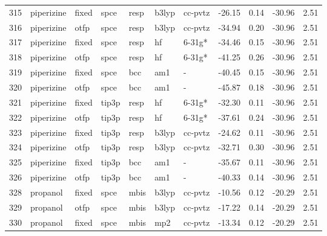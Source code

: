 \begin{tabular}{lllllllrrrr}
315 &                    piperizine &  fixed &   spce &   resp &   b3lyp &      cc-pvtz &      -26.15 &     0.14 &      -30.96 &      2.51 \\
316 &                    piperizine &   otfp &   spce &   resp &   b3lyp &      cc-pvtz &      -34.94 &     0.20 &      -30.96 &      2.51 \\
317 &                    piperizine &  fixed &   spce &   resp &      hf &       6-31g* &      -34.46 &     0.15 &      -30.96 &      2.51 \\
318 &                    piperizine &   otfp &   spce &   resp &      hf &       6-31g* &      -41.25 &     0.26 &      -30.96 &      2.51 \\
319 &                    piperizine &  fixed &   spce &    bcc &     am1 &            - &      -40.45 &     0.15 &      -30.96 &      2.51 \\
320 &                    piperizine &   otfp &   spce &    bcc &     am1 &            - &      -45.87 &     0.18 &      -30.96 &      2.51 \\
321 &                    piperizine &  fixed &  tip3p &   resp &      hf &       6-31g* &      -32.30 &     0.11 &      -30.96 &      2.51 \\
322 &                    piperizine &   otfp &  tip3p &   resp &      hf &       6-31g* &      -37.61 &     0.24 &      -30.96 &      2.51 \\
323 &                    piperizine &  fixed &  tip3p &   resp &   b3lyp &      cc-pvtz &      -24.62 &     0.11 &      -30.96 &      2.51 \\
324 &                    piperizine &   otfp &  tip3p &   resp &   b3lyp &      cc-pvtz &      -32.71 &     0.30 &      -30.96 &      2.51 \\
325 &                    piperizine &  fixed &  tip3p &    bcc &     am1 &            - &      -35.67 &     0.11 &      -30.96 &      2.51 \\
326 &                    piperizine &   otfp &  tip3p &    bcc &     am1 &            - &      -40.33 &     0.14 &      -30.96 &      2.51 \\
328 &                      propanol &  fixed &   spce &   mbis &   b3lyp &      cc-pvtz &      -10.56 &     0.12 &      -20.29 &      2.51 \\
329 &                      propanol &   otfp &   spce &   mbis &   b3lyp &      cc-pvtz &      -17.22 &     0.14 &      -20.29 &      2.51 \\
330 &                      propanol &  fixed &   spce &   mbis &     mp2 &      cc-pvtz &      -13.34 &     0.12 &      -20.29 &      2.51 \\

\end{tabular}
